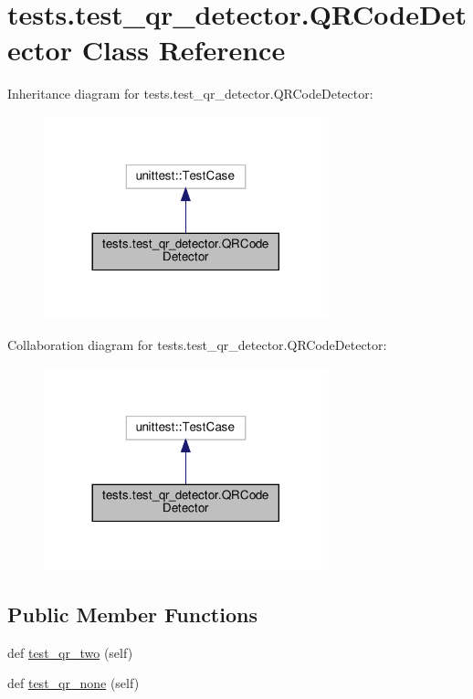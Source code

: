 \hypertarget{classtests_1_1test__qr__detector_1_1QRCodeDetector}{}\section{tests.\+test\+\_\+qr\+\_\+detector.\+Q\+R\+Code\+Detector Class Reference}
\label{classtests_1_1test__qr__detector_1_1QRCodeDetector}


Inheritance diagram for tests.\+test\+\_\+qr\+\_\+detector.\+Q\+R\+Code\+Detector\+:
\nopagebreak
\begin{figure}[H]
\begin{center}
\leavevmode
\includegraphics[width=233pt]{classtests_1_1test__qr__detector_1_1QRCodeDetector__inherit__graph}
\end{center}
\end{figure}


Collaboration diagram for tests.\+test\+\_\+qr\+\_\+detector.\+Q\+R\+Code\+Detector\+:
\nopagebreak
\begin{figure}[H]
\begin{center}
\leavevmode
\includegraphics[width=233pt]{classtests_1_1test__qr__detector_1_1QRCodeDetector__coll__graph}
\end{center}
\end{figure}
\subsection*{Public Member Functions}
\begin{DoxyCompactItemize}
\item 
def \hyperlink{classtests_1_1test__qr__detector_1_1QRCodeDetector_aef2873e9db29b887fa97e0ecea69a299}{test\+\_\+qr\+\_\+two} (self)
\item 
def \hyperlink{classtests_1_1test__qr__detector_1_1QRCodeDetector_a00ebded7ee21c4c924cbd1bffdff23d9}{test\+\_\+qr\+\_\+none} (self)
\end{DoxyCompactItemize}


